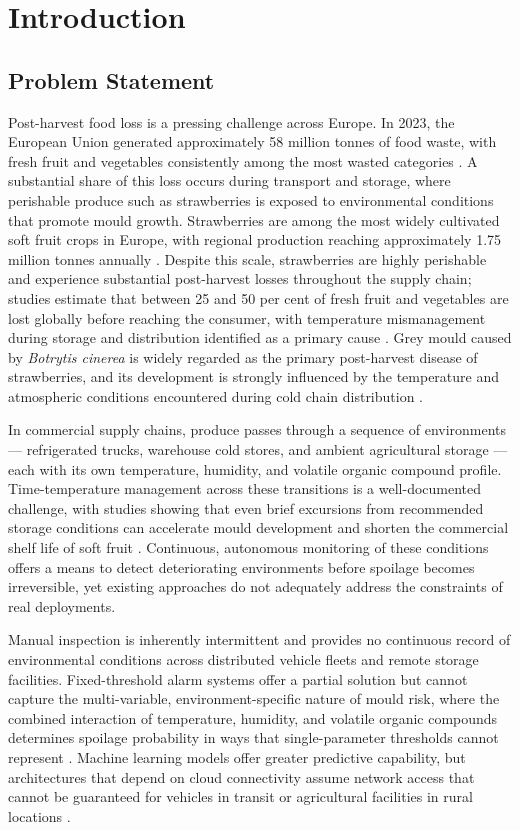 \chapter{Introduction}\label{chap:rationale}

\section{Problem Statement}

Post-harvest food loss is a pressing challenge across Europe. In 2023, the European Union generated approximately 58 million tonnes of food waste, with fresh fruit and vegetables consistently among the most wasted categories \cite{Eurostat2023}. A substantial share of this loss occurs during transport and storage, where perishable produce such as strawberries is exposed to environmental conditions that promote mould growth. Strawberries are among the most widely cultivated soft fruit crops in Europe, with regional production reaching approximately 1.75 million tonnes annually \cite{FAOSTAT2024}. Despite this scale, strawberries are highly perishable and experience substantial post-harvest losses throughout the supply chain; studies estimate that between 25 and 50 per cent of fresh fruit and vegetables are lost globally before reaching the consumer, with temperature mismanagement during storage and distribution identified as a primary cause \cite{EC2019}. Grey mould caused by \textit{Botrytis cinerea} is widely regarded as the primary post-harvest disease of strawberries, and its development is strongly influenced by the temperature and atmospheric conditions encountered during cold chain distribution \cite{Petrasch2019, Nunes2012}.

In commercial supply chains, produce passes through a sequence of environments --- refrigerated trucks, warehouse cold stores, and ambient agricultural storage --- each with its own temperature, humidity, and volatile organic compound profile. Time-temperature management across these transitions is a well-documented challenge, with studies showing that even brief excursions from recommended storage conditions can accelerate mould development and shorten the commercial shelf life of soft fruit \cite{Mercier2017}. Continuous, autonomous monitoring of these conditions offers a means to detect deteriorating environments before spoilage becomes irreversible, yet existing approaches do not adequately address the constraints of real deployments.

Manual inspection is inherently intermittent and provides no continuous record of environmental conditions across distributed vehicle fleets and remote storage facilities. Fixed-threshold alarm systems offer a partial solution but cannot capture the multi-variable, environment-specific nature of mould risk, where the combined interaction of temperature, humidity, and volatile organic compounds determines spoilage probability in ways that single-parameter thresholds cannot represent \cite{Wang2024}. Machine learning models offer greater predictive capability, but architectures that depend on cloud connectivity assume network access that cannot be guaranteed for vehicles in transit or agricultural facilities in rural locations \cite{Lamberty2025}.


